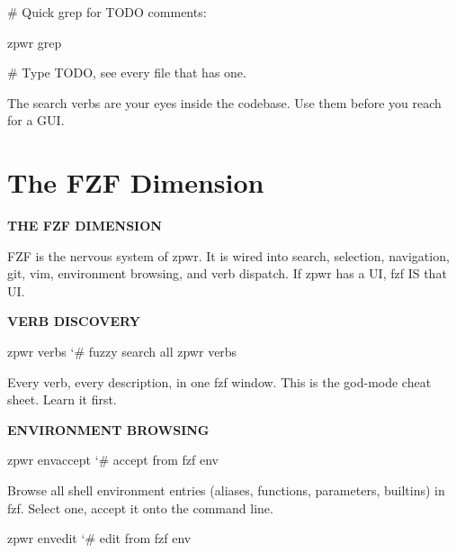 \documentclass[11pt,a4paper,twoside]{book}
\begin{document}
\# Quick grep for TODO comments:

\begin{codebox}
\color{neongreen}zpwr grep\\
\end{codebox}

\# Type TODO, see every file that has one.

The search verbs are your eyes inside the codebase. Use them before you reach for a GUI.


\vspace{16pt}

\section{The FZF Dimension}


\vspace{10pt}
{\large\bfseries\color{neoncyan} THE FZF DIMENSION}\vspace{6pt}

FZF is the nervous system of zpwr. It is wired into search, selection, navigation, git, vim, environment browsing, and verb dispatch. If zpwr has a UI, fzf IS that UI.


\vspace{12pt}
{\bfseries\color{neonyellow} VERB DISCOVERY}\vspace{4pt}

\begin{codebox}
\color{neongreen}zpwr verbs     {\char`\#} fuzzy search all zpwr verbs\\
\end{codebox}

Every verb, every description, in one fzf window. This is the god-mode cheat sheet. Learn it first.


\vspace{12pt}
{\bfseries\color{neonyellow} ENVIRONMENT BROWSING}\vspace{4pt}

\begin{codebox}
\color{neongreen}zpwr envaccept          {\char`\#} accept from fzf env\\
\end{codebox}

Browse all shell environment entries (aliases, functions, parameters, builtins) in fzf. Select one, accept it onto the command line.

\begin{codebox}
\color{neongreen}zpwr envedit            {\char`\#} edit from fzf env\\
\end{codebox}
\end{document}
